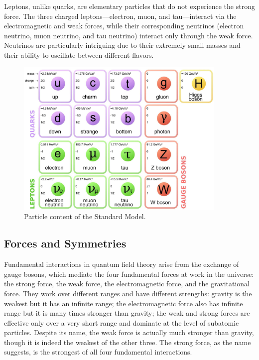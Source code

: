 Leptons, unlike quarks, are elementary particles that do not experience the strong force. The three charged leptons—electron, muon, and tau—interact via the electromagnetic and weak forces, while their corresponding neutrinos (electron neutrino, muon neutrino, and tau neutrino) interact only through the weak force. Neutrinos are particularly intriguing due to their extremely small masses and their ability to oscillate between different flavors.

% 

\begin{figure}
\centering
\includegraphics[width=0.9\textwidth,clip] {figures/2000px-Standard_Model_of_Elementary_Particles.png}
\caption{Particle content of the Standard Model.}
\label{fig:standardmodel}
\end{figure}

\subsection{Forces and Symmetries}

Fundamental interactions in quantum field theory arise from the exchange of gauge bosons, which mediate the four fundamental forces at work in the universe: the strong force, the weak force, the electromagnetic force, and the gravitational force. They work over different ranges and have different strengths: gravity is the weakest but it has an infinite range; the electromagnetic force also has infinite range but it is many times stronger than gravity; the weak and strong forces are effective only over a very short range and dominate at the level of subatomic particles. Despite its name, the weak force is actually much stronger than gravity, though it is indeed the weakest of the other three. The strong force, as the name suggests, is the strongest of all four fundamental interactions.


